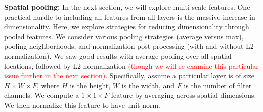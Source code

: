 \documentclass[10pt,twocolumn,letterpaper]{article}
\newcommand{\deva}[1]{\textcolor{blue}{[Deva: #1]}}
\newcommand{\new}[1]{\textcolor{red}{#1}}
\newcommand{\songfan}[1]{\textcolor{blue}{[Songfan: #1]}}
\begin{document}
{\bf Spatial pooling:} In the next section, we will explore multi-scale features. One practical hurdle to including all features from all layers is the massive increase in dimensionality. Here, we explore strategies for reducing dimensionality through pooled features. We consider various pooling strategies (average versus max), pooling neighborhoods, and normalization post-processing (with and without L2 normalization). We saw good results with average pooling over all spatial locations, followed by L2 normalization \new{(though we will re-examine this particular issue further in the next section)}. Specifically, assume a particular layer is of size $H \times W \times F$, where $H$ is the height, $W$ is the width, and $F$ is the number of filter channels. We compute a $1 \times 1 \times F$ feature by averaging across spatial dimensions. We then normalize this feature to have unit norm. %


\end{document}
